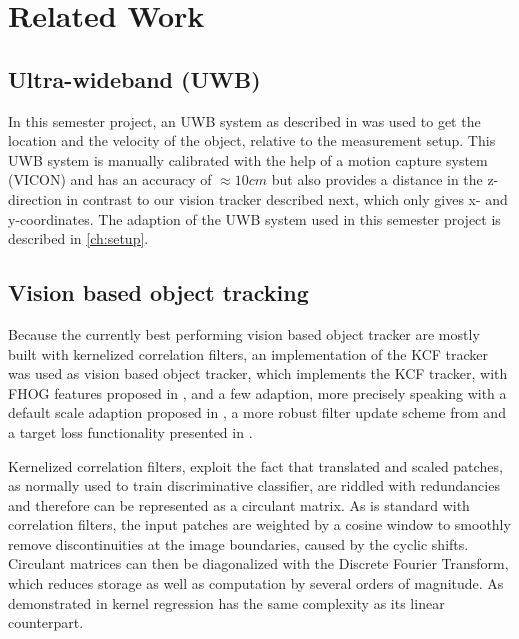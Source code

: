 
\setcounter{chapter}{1}

\chapter{Related Work}

\section{Ultra-wideband (UWB)}
In this semester project, an \ac{UWB} system as described in \cite{Naegeli:2016} was used to get the location and the velocity of the object, relative to the measurement setup. This \ac{UWB} system is manually calibrated with the help of a motion capture system (VICON) and has an accuracy of $\approx 10 cm$ but also provides a distance in the z-direction in contrast to our vision tracker described next, which only gives x- and y-coordinates. The adaption of the \ac{UWB} system used in this semester project is described in \autoref{ch:setup}.

\section{Vision based object tracking}
Because the currently best performing vision based object tracker are mostly built with kernelized correlation filters, an implementation of the \ac{KCF} tracker \cite{henriques2015tracking} was used as vision based object tracker\cite{Haag:2015}, which implements the \ac{KCF} tracker, with FHOG features proposed in \cite{lsvm-pami}, and a few adaption, more precisely speaking with a default scale adaption proposed in \cite{danelljan2014dsst}, a more robust filter update scheme from \cite{danelljan2014colorattributes} and a target loss functionality presented in \cite{bolme2010mosse}.

Kernelized correlation filters, exploit the fact that translated and scaled patches, as normally used to train discriminative classifier, are riddled with redundancies and therefore can be represented as a circulant matrix. As is standard with correlation filters, the input patches are weighted by a cosine window to smoothly remove discontinuities at the image boundaries, caused by the cyclic shifts. Circulant matrices can then be diagonalized with the Discrete Fourier Transform, which reduces storage as well as computation by several orders of magnitude. As demonstrated in \cite{henriques2015tracking} kernel regression has the same complexity as its linear counterpart.

